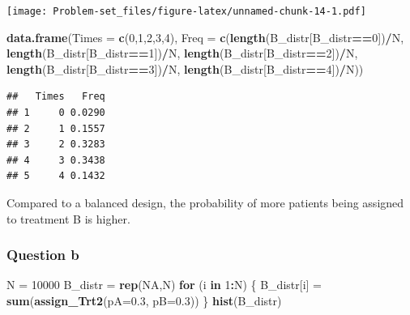 \documentclass[]{article}
\newenvironment{Shaded}{\begin{snugshade}}{\end{snugshade}}
\newcommand{\ControlFlowTok}[1]{\textcolor[rgb]{0.13,0.29,0.53}{\textbf{#1}}}
\newcommand{\DataTypeTok}[1]{\textcolor[rgb]{0.13,0.29,0.53}{#1}}
\newcommand{\DecValTok}[1]{\textcolor[rgb]{0.00,0.00,0.81}{#1}}
\newcommand{\FloatTok}[1]{\textcolor[rgb]{0.00,0.00,0.81}{#1}}
\newcommand{\KeywordTok}[1]{\textcolor[rgb]{0.13,0.29,0.53}{\textbf{#1}}}
\newcommand{\NormalTok}[1]{#1}
\newcommand{\OperatorTok}[1]{\textcolor[rgb]{0.81,0.36,0.00}{\textbf{#1}}}
\newcommand{\OtherTok}[1]{\textcolor[rgb]{0.56,0.35,0.01}{#1}}
\newcommand{\StringTok}[1]{\textcolor[rgb]{0.31,0.60,0.02}{#1}}
\begin{document}
\texttt{[image: Problem-set\_files/figure-latex/unnamed-chunk-14-1.pdf]}

\begin{Shaded}
\begin{Highlighting}[]
\KeywordTok{data.frame}\NormalTok{(}\DataTypeTok{Times =} \KeywordTok{c}\NormalTok{(}\DecValTok{0}\NormalTok{,}\DecValTok{1}\NormalTok{,}\DecValTok{2}\NormalTok{,}\DecValTok{3}\NormalTok{,}\DecValTok{4}\NormalTok{), }\DataTypeTok{Freq =} \KeywordTok{c}\NormalTok{(}\KeywordTok{length}\NormalTok{(B_distr[B_distr}\OperatorTok{==}\DecValTok{0}\NormalTok{])}\OperatorTok{/}\NormalTok{N, }\KeywordTok{length}\NormalTok{(B_distr[B_distr}\OperatorTok{==}\DecValTok{1}\NormalTok{])}\OperatorTok{/}\NormalTok{N, }\KeywordTok{length}\NormalTok{(B_distr[B_distr}\OperatorTok{==}\DecValTok{2}\NormalTok{])}\OperatorTok{/}\NormalTok{N, }\KeywordTok{length}\NormalTok{(B_distr[B_distr}\OperatorTok{==}\DecValTok{3}\NormalTok{])}\OperatorTok{/}\NormalTok{N, }\KeywordTok{length}\NormalTok{(B_distr[B_distr}\OperatorTok{==}\DecValTok{4}\NormalTok{])}\OperatorTok{/}\NormalTok{N))}
\end{Highlighting}
\end{Shaded}

\begin{verbatim}
##   Times   Freq
## 1     0 0.0290
## 2     1 0.1557
## 3     2 0.3283
## 4     3 0.3438
## 5     4 0.1432
\end{verbatim}

Compared to a balanced design, the probability of more patients being
assigned to treatment B is higher.

\hypertarget{question-b-6}{%
\subsubsection{Question b}\label{question-b-6}}

\begin{Shaded}
\begin{Highlighting}[]
\NormalTok{N =}\StringTok{ }\DecValTok{10000}
\NormalTok{B_distr =}\StringTok{ }\KeywordTok{rep}\NormalTok{(}\OtherTok{NA}\NormalTok{,N)}
\ControlFlowTok{for}\NormalTok{ (i }\ControlFlowTok{in} \DecValTok{1}\OperatorTok{:}\NormalTok{N) \{}
\NormalTok{  B_distr[i] =}\StringTok{ }\KeywordTok{sum}\NormalTok{(}\KeywordTok{assign_Trt2}\NormalTok{(}\DataTypeTok{pA=}\FloatTok{0.3}\NormalTok{, }\DataTypeTok{pB=}\FloatTok{0.3}\NormalTok{))}
\NormalTok{\}}
\KeywordTok{hist}\NormalTok{(B_distr)}
\end{Highlighting}
\end{Shaded}
\end{document}
